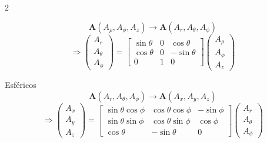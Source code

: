 \begin{multicols}{2}
\begin{itemform}
                              $$\mathbf{A}(A_\rho, A_\phi, A_z) \to \mathbf{A}(A_r, A_\theta, A_\phi)$$
                              $$\Rightarrow
                              \begin{pmatrix}
                                A_r \\
                                A_\theta \\
                                A_\phi
                              \end{pmatrix}
                              =
                              \begin{bmatrix}
                                \sin\theta & 0 & \cos\theta \\
                                \cos\theta & 0 & -\sin\theta \\
                                0 & 1 & 0
                              \end{bmatrix}
                              \begin{pmatrix}
                                A_\rho \\
                                A_\phi \\
                                A_z
                              \end{pmatrix}
                              $$

                            \item Esféricos
                              $$\mathbf{A}(A_r, A_\theta, A_\phi) \to \mathbf{A}(A_x, A_y, A_z)$$
                              $$\Rightarrow
                              \begin{pmatrix}
                                A_x \\
                                A_y \\
                                A_z
                              \end{pmatrix}
                              =
                              \begin{bmatrix}
                                \sin\theta\cos\phi & \cos\theta\cos\phi & -\sin\phi \\
                                \sin\theta\sin\phi & \cos\theta\sin\phi & \cos\phi \\
                                \cos\theta & -\sin\theta & 0
                              \end{bmatrix}
                              \begin{pmatrix}
                                A_r \\
                                A_\theta \\
                                A_\phi
                              \end{pmatrix}
                              $$


\end{itemform}
\end{multicols}
